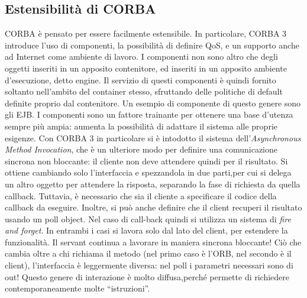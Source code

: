 \subsection{Estensibilità di CORBA}
CORBA è pensato per essere facilmente estensibile. In particolare, CORBA 3 introduce l'uso di componenti, la possibilità
di definire QoS, e un supporto anche ad Internet come ambiente di lavoro.
I componenti non sono altro che degli oggetti inseriti in un apposito contenitore, ed inseriti in un apposito ambiente
d'esecuzione, detto engine. Il servizio di questi componenti è quindi fornito soltanto nell'ambito del container stesso,
sfruttando delle politiche di default definite proprio dal contenitore. Un esempio di componente di questo genere sono
gli EJB.
I componenti sono un fattore trainante per ottenere una base d'utenza sempre più ampia: aumenta la possibilità di
adattare il sistema alle proprie esigenze.
Con CORBA 3 in particolare si è intodotto il sistema dell'\textit{Asynchronous Method Invocation}, che è un ulteriore
modo per definire una comunicazione sincrona non bloccante: il cliente non deve attendere quindi per il risultato.
Si ottiene cambiando solo l'interfaccia e spezzandola in due parti,per cui si delega un altro oggetto per attendere la risposta, separando la fase
di richiesta da quella callback. Tuttavia, è necessario che sia il cliente a specificare il codice della callback da
eseguire.
Inoltre, si può anche definire che il client recuperi il risultato usando un poll object. Nel caso di call-back quindi
si utilizza un sistema di \textit{fire and forget}. In entrambi i casi si lavora solo dal lato del client, per estendere
la funzionalità.
Il servant continua a lavorare in maniera sincrona bloccante! Ciò che cambia oltre a chi richiama il metodo (nel primo
caso è l'ORB, nel secondo è il client), l'interfaccia è leggermente diversa: nel poll i parametri necessari sono di out!
Questo genere di interazione è molto diffusa,perché permette di richiedere contemporaneamente molte ``istruzioni''.
